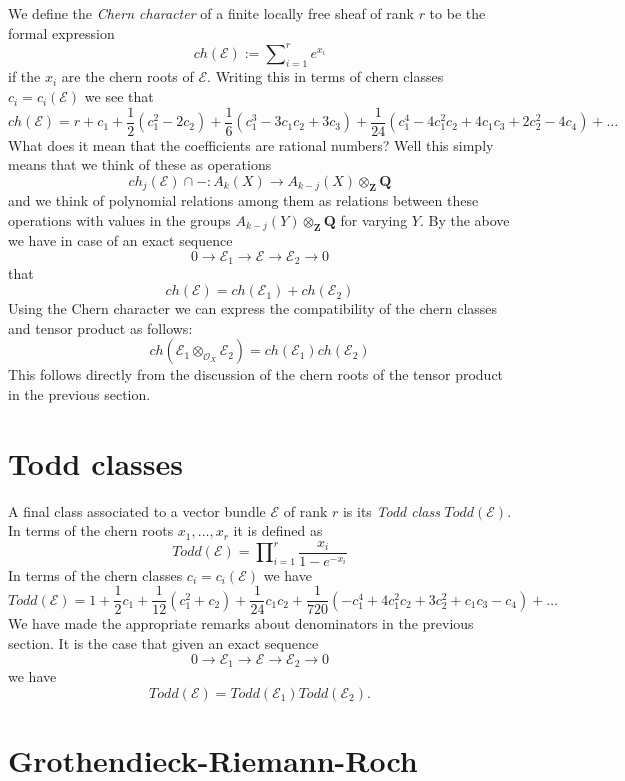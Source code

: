 \noindent
We define the {\it Chern character} of a finite locally free
sheaf of rank $r$ to be the formal expression
$$
ch({\mathcal E}) := \sum\nolimits_{i=1}^r e^{x_i}
$$
if the $x_i$ are the chern roots of ${\mathcal E}$. Writing this in
terms of chern classes $c_i = c_i(\mathcal{E})$
we see that
$$
ch(\mathcal{E}) =
r
+
c_1
+
\frac{1}{2}(c_1^2 - 2c_2)
+
\frac{1}{6}(c_1^3 - 3c_1c_2 + 3c_3)
+
\frac{1}{24}(c_1^4 - 4c_1^2c_2 + 4c_1c_3 + 2c_2^2 - 4c_4)
+
\ldots
$$
What does it mean that the coefficients are rational numbers?
Well this simply means that we think of these as operations
$$
ch_j(\mathcal{E}) \cap - :
A_k(X)
\longrightarrow
A_{k - j}(X) \otimes_{\mathbf{Z}} \mathbf{Q}
$$
and we think of polynomial relations among them as relations
between these operations with values in the groups
$A_{k - j}(Y) \otimes_{\mathbf{Z}} \mathbf{Q}$ for varying $Y$.
By the above
we have in case of an exact sequence
$$
0
\to
{\mathcal E}_1
\to
{\mathcal E}
\to
{\mathcal E}_2
\to
0
$$
that
$$
ch({\mathcal E}) = ch({\mathcal E}_1) + ch({\mathcal E}_2)
$$
Using the Chern character we can express the compatibility
of the chern classes and tensor product as follows:
$$
ch({\mathcal E}_1 \otimes_{{\mathcal O}_X} {\mathcal E}_2) =
ch({\mathcal E}_1) ch({\mathcal E}_2)
$$
This follows directly from the discussion of the chern roots
of the tensor product in the previous section.


\section{Todd classes}
\label{section-todd-classes}

\noindent
A final class associated to a vector bundle $\mathcal{E}$
of rank $r$ is its {\it Todd class} $Todd(\mathcal{E})$.
In terms of the chern roots $x_1, \ldots, x_r$ it is
defined as
$$
Todd(\mathcal{E})
=
\prod\nolimits_{i = 1}^r
\frac{x_i}{1 - e^{-x_i}}
$$
In terms of the chern classes $c_i = c_i(\mathcal{E})$
we have
$$
Todd(\mathcal{E})
=
1
+
\frac{1}{2}c_1
+
\frac{1}{12}(c_1^2 + c_2)
+
\frac{1}{24}c_1c_2
+
\frac{1}{720}(-c_1^4 + 4c_1^2c_2 + 3c_2^2 + c_1c_3 - c_4)
+
\ldots
$$
We have made the appropriate remarks about denominators
in the previous section. It is the case that
given an exact sequence
$$
0
\to
{\mathcal E}_1
\to
{\mathcal E}
\to
{\mathcal E}_2
\to
0
$$
we have
$$
Todd({\mathcal E}) = Todd({\mathcal E}_1) Todd({\mathcal E}_2).
$$

\section{Grothendieck-Riemann-Roch}
\label{section-grr}

